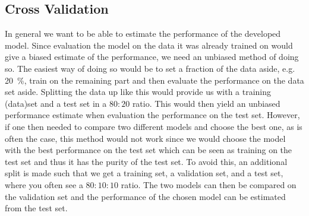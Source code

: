 \subsection{Cross Validation}
\label{subsec:cross_validation}
In general we want to  be able to estimate the performance of the developed model. Since evaluation the model on the data it was already trained on would give a biased estimate of the performance, we need an unbiased method of doing so. The easiest way of doing so would be to set a fraction of the data aside, e.g. \SI{20}{\percent}, train on the remaining part and then evaluate the performance on the data set aside. Splitting the data up like this would provide us with a training (data)set and a test set in a $\num{80}:\num{20}$ ratio. This would then yield an unbiased performance estimate when evaluation the performance on the test set. 
However, if one then needed to compare two different models and choose the best one, as is often the case, this method would not work since we would choose the model with the best performance on the test set which can be seen as training on the test set and thus it has  the purity of the test set. To avoid this, an additional split is made such that we get a training set, a validation set, and a test set, where you often see a $\num{80}:\num{10}:\num{10}$ ratio. The two models can then be compared on the validation set and the performance of the chosen model can be estimated from the test set. 

